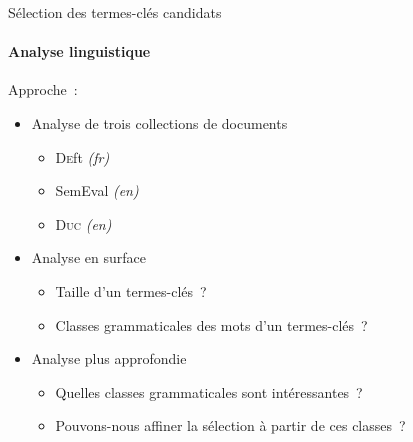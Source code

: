 \begin{frame}[label=selection_des_candidats]{Sélection des termes-clés candidats}\framesubtitle{Analyse linguistique}
  Approche~:
  \begin{itemize}
    \item{Analyse de trois collections de documents}
    \begin{itemize}
      \item{\textsc{De}ft \textit{(fr)}}
      \item{SemEval \textit{(en)}}
      \item{\textsc{Duc} \textit{(en)}}
    \end{itemize}
    \item{Analyse en surface}
    \begin{itemize}
      \item{Taille d'un termes-clés~?}
      \item{Classes grammaticales des mots d'un termes-clés~?}
    \end{itemize}
    \item{Analyse plus approfondie}
    \begin{itemize}
      \item{Quelles classes grammaticales sont intéressantes~?}
      \item{Pouvons-nous affiner la sélection à partir de ces classes~?}
    \end{itemize}
  \end{itemize}
\end{frame}
